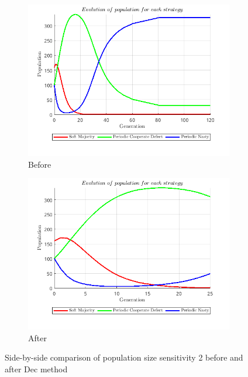 \documentclass[12pt]{report}
\begin{document}
\begin{figure}[H]
    \centering
    \begin{subfigure}[t]{0.45\textwidth}
        \centering
        \includegraphics[width=\textwidth]{population_size_sensitivity_2_before_dec.png}
        \caption{Before}
    \end{subfigure}
    \hfill
    \begin{subfigure}[t]{0.45\textwidth}
        \centering
        \includegraphics[width=\textwidth]{population_size_sensitivity_2_after_dec.png}
        \caption{After}
    \end{subfigure}
    \caption{Side-by-side comparison of population size sensitivity 2 before and after Dec method}
\end{figure}
\end{document}
